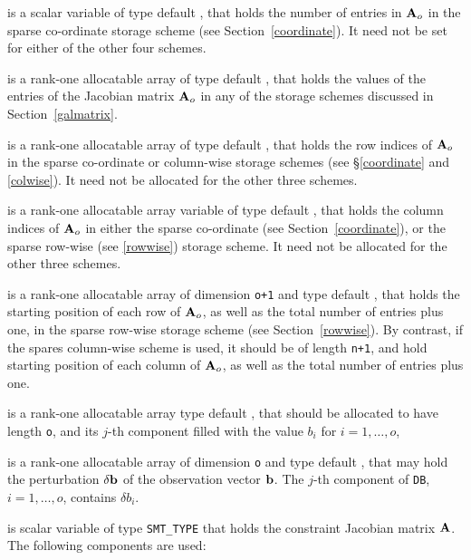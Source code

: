 \documentclass{galahad}
\begin{document}
\begin{description}
\begin{description}
 is a scalar variable of type default \integer, that
holds the number of entries in ${\mathbf{A}}_o$
in the sparse co-ordinate storage scheme (see Section~\ref{coordinate}).
It need not be set for either of the other four schemes.

 is a rank-one allocatable array of type default \realdp, that
holds
the values of the entries of the Jacobian matrix ${\mathbf{A}}_o$ in any of the
storage schemes discussed in Section~\ref{galmatrix}.

 is a rank-one allocatable array of type default \integer,
that holds the row indices of ${\mathbf{A}}_o$ in the sparse co-ordinate
or column-wise storage schemes (see \S\ref{coordinate} and \ref{colwise}).
It need not be allocated for the other three schemes.

 is a rank-one allocatable array variable of type default \integer,
that holds the column indices of ${\mathbf{A}}_o$ in either the sparse co-ordinate
(see Section~\ref{coordinate}), or the sparse row-wise
(see \ref{rowwise}) storage scheme.
It need not be allocated for the other three schemes.

 is a rank-one allocatable array of dimension {\tt o+1} and type
default \integer, that holds the
starting position of each row of ${\mathbf{A}}_o$, as well
as the total number of entries plus one, in the sparse row-wise storage
scheme (see Section~\ref{rowwise}). By contrast, if the spares column-wise
scheme is used, it should be of length {\tt n+1}, and hold
starting position of each column of ${\mathbf{A}}_o$, as well
as the total number of entries plus one.
\end{description}

 is a rank-one allocatable array type default \realdp, that
should be allocated to have length {\tt o}, and its $j$-th component
filled with the value $b_{i}$ for $i = 1, \ldots , o$,

 is a rank-one allocatable array of dimension {\tt o} and type
default \realdp, that may hold the perturbation $\delta {\mathbf{b}}$
of the observation vector ${\mathbf{b}}$.
The $j$-th component of
{\tt DB}, $i = 1,  \ldots ,  o$, contains $\delta b_{i}$.

 is scalar variable of type {\tt SMT\_TYPE} that holds the constraint
Jacobian matrix ${\mathbf{A}}$. The following components are used:

\begin{description}


\end{description}
\end{description}
\end{document}
